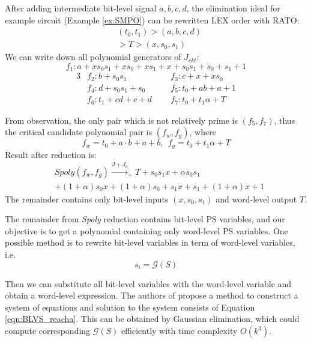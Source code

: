 \begin{Example}
After adding intermediate bit-level signal $a,b,c,d$, the elimination ideal for example circuit 
(Example \ref{ex:SMPO}) can be rewritten LEX order with RATO:
\begin{align}
&(t_0,t_1)>(a,b,c,d)\nonumber\\&>T>(x,s_0,s_1)\nonumber
\end{align}
We can write down all polynomial generators of $J_{ckt}$:
\begin{equation*}
f_1: a+xs_0s_1+xs_0+xs_1+x+s_0s_1+s_0+s_1+1
\end{equation*}
\vspace{-0.8cm}
\begin{alignat*}{3}
& f_2: b+s_0s_1 &&~~~ f_3: c+x+xs_0 \\
& f_4: d+s_0s_1+s_0 &&~~~ f_5: t_0+ab+a+1 \\
& f_6: t_1+cd+c+d &&~~~ f_7: t_0+t_1\alpha+T 
\end{alignat*}

From observation, the only pair which is not relatively prime is
$(f_5,f_7)$, thus the critical candidate polynomial pair is
$(f_w,f_g)$, where $$f_w = t_0+a\cdot b+a+b, ~~f_g =t_0+t_1\alpha + T$$
Result after reduction is:
\begin{align}
&Spoly(f_w,f_g) \xrightarrow{J+J_0}_{+}T + s_0 s_1 x+\alpha s_0 s_1 \nonumber\\
&+(1+\alpha)s_0 x+(1+\alpha) s_0+s_1 x+s_1+(1+\alpha) x+1\nonumber
\end{align}
The remainder contains only bit-level inputs $(x,s_0,s_1)$ and word-level output $T$.
\end{Example}


The remainder from \emph{Spoly} reduction contains bit-level PS variables, and our objective is to get a polynomial 
containing only word-level PS variables. One possible method is 
to rewrite bit-level variables in term of word-level variables, i.e.
\begin{equation}
\label{eqn:BLVS_reacha}
s_i = \mathcal{G}(S)
\end{equation}

Then we can substitute all bit-level variables with the word-level variable
and obtain a word-level expression.
The authors of \cite{pruss:tcad15} propose a method to construct 
a system of equations and solution to the system consists of Equation \ref{eqn:BLVS_reacha}.
This can be obtained by Gaussian elimination, which could 
compute corresponding $\mathcal{G}(S)$ efficiently with time complexity $O(k^3)$.

